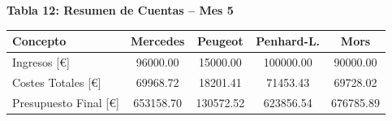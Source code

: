 \documentclass{standalone}
\begin{document}
\begin{minipage}{1.08\linewidth}
		\textbf{Tabla 12: Resumen de Cuentas – Mes 5}\\[0.5em]
		\begin{tabular}{@{}l
				S[table-format=7.2]
				S[table-format=7.2]
				S[table-format=7.2]
				S[table-format=7.2]@{}}
			\toprule
			\textbf{Concepto} & \textbf{Mercedes} & \textbf{Peugeot} & \textbf{Penhard-L.} & \textbf{Mors} \\
			\midrule
			Ingresos [\euro] & 96000.00 & 15000.00 & 100000.00 & 90000.00 \\
			Costes Totales [\euro] & 69968.72 & 18201.41 & 71453.43 & 69728.02 \\
			Presupuesto Final [\euro] & 653158.70 & 130572.52 & 623856.54 & 676785.89 \\
			\bottomrule
		\end{tabular}
		
	\end{minipage}
	
\end{document}
